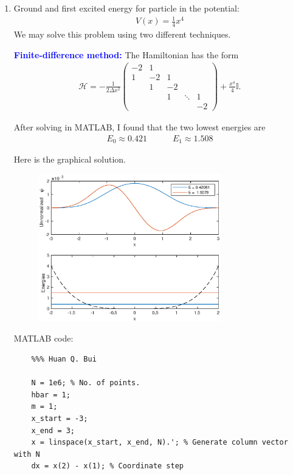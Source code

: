 \documentclass{article}
\theoremstyle{definition}
\newcommand{\ham}{\mathcal{H}}
\newcommand{\f}[2]{\frac{#1}{#2}}
\begin{document}
\begin{enumerate}[label=(\alph*)]
	\item Ground and first excited energy for particle in the potential:
	\begin{align*}
	V(x) = \f{1}{4}x^4
	\end{align*}
	We may solve this problem using two different techniques. 
	
	\textbf{\textcolor{blue}{Finite-difference method:}} The Hamiltonian has the form 
	\begin{align*}
	\ham = -\f{1}{2\Delta x^2}\begin{pmatrix}
	-2 & 1 \\
	1  & -2 & 1 \\
	   & 1  & -2 & \\
	   &    & 1  & \ddots & 1\\
	   &    &    &        &-2
	\end{pmatrix}
	+ \f{x^4}{4}\mathbb{I}.
	\end{align*}
	
	After solving in MATLAB, I found that the two lowest energies are
	\begin{align*}
	\boxed{E_0 \approx 0.421} \quad\quad\quad \boxed{E_1 \approx 1.508}
	\end{align*}
	
	Here is the graphical solution. 
	\begin{figure}[!htb]
		\centering
		\includegraphics[width=0.75\textwidth]{problem3a.eps}
	\end{figure}



	
	MATLAB code:
	\begin{lstlisting}
	%%% Huan Q. Bui
	
	N = 1e6; % No. of points.
	hbar = 1;
	m = 1;
	x_start = -3;
	x_end = 3;
	x = linspace(x_start, x_end, N).'; % Generate column vector with N 
	dx = x(2) - x(1); % Coordinate step
	

\end{lstlisting}
\end{enumerate}
\end{document}
